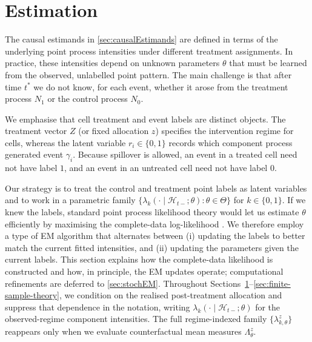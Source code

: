 \documentclass{statsoc}
\newcommand{\1}{\mathbbm{1}}
\begin{document}
\section{Estimation}\label{sec:estimation}

The causal estimands in \cref{sec:causalEstimands} are defined in terms of the underlying point process intensities under different treatment assignments. In practice, these intensities depend on unknown parameters $\theta$ that must be learned from the observed, unlabelled point pattern. The main challenge is that after time $t^\ast$ we do not know, for each event, whether it arose from the treatment process $N_1$ or the control process $N_0$. 

We emphasise that cell treatment and event labels are distinct objects. The treatment vector \(Z\) (or fixed allocation \(z\)) specifies the intervention regime for cells, whereas the latent variable \(r_i\in\{0,1\}\) records which component process generated event \(\gamma_i\). Because spillover is allowed, an event in a treated cell need not have label \(1\), and an event in an untreated cell need not have label \(0\).

Our strategy is to treat the control and treatment point labels as latent variables and to work in a parametric family $\{\lambda_k(\cdot\mid\mathcal H_{t-};\theta):\theta\in\Theta\}$ for $k\in\{0,1\}$. If we knew the labels, standard point process likelihood theory would let us estimate $\theta$ efficiently by maximising the complete-data log-likelihood \citep{ogata1978asymptotic}. We therefore employ a type of EM algorithm that alternates between (i) updating the labels to better match the current fitted intensities, and (ii) updating the parameters given the current labels. This section explains how the complete-data likelihood is constructed and how, in principle, the EM updates operate; computational refinements are deferred to \cref{sec:stochEM}. Throughout Sections~\ref{sec:estimation}--\ref{sec:finite-sample-theory}, we condition on the realised post-treatment allocation and suppress that dependence in the notation, writing \(\lambda_k(\cdot\mid\mathcal H_{t-};\theta)\) for the observed-regime component intensities. The full regime-indexed family \(\{\lambda_{k,\theta}^z\}\) reappears only when we evaluate counterfactual mean measures \(\Lambda_\theta^z\).
\end{document}

